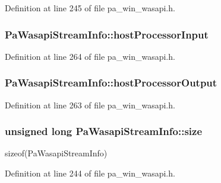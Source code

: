 Definition at line 245 of file pa\+\_\+win\+\_\+wasapi.\+h.

\subsubsection[{\texorpdfstring{host\+Processor\+Input}{hostProcessorInput}}]{ Pa\+Wasapi\+Stream\+Info\+::host\+Processor\+Input}\hypertarget{struct_pa_wasapi_stream_info_a0cb8bd209c8b453e9d1d08909e63ac38}{}\label{struct_pa_wasapi_stream_info_a0cb8bd209c8b453e9d1d08909e63ac38}


Definition at line 264 of file pa\+\_\+win\+\_\+wasapi.\+h.

\subsubsection[{\texorpdfstring{host\+Processor\+Output}{hostProcessorOutput}}]{ Pa\+Wasapi\+Stream\+Info\+::host\+Processor\+Output}\hypertarget{struct_pa_wasapi_stream_info_a300576059815d6ab77af37f708f818ac}{}\label{struct_pa_wasapi_stream_info_a300576059815d6ab77af37f708f818ac}


Definition at line 263 of file pa\+\_\+win\+\_\+wasapi.\+h.

\subsubsection[{\texorpdfstring{size}{size}}]{\setlength{\rightskip}{0pt plus 5cm}unsigned long Pa\+Wasapi\+Stream\+Info\+::size}\hypertarget{struct_pa_wasapi_stream_info_ae491f41ce5954cddd438624dc69eba1b}{}\label{struct_pa_wasapi_stream_info_ae491f41ce5954cddd438624dc69eba1b}
sizeof(\+Pa\+Wasapi\+Stream\+Info) 

Definition at line 244 of file pa\+\_\+win\+\_\+wasapi.\+h.

